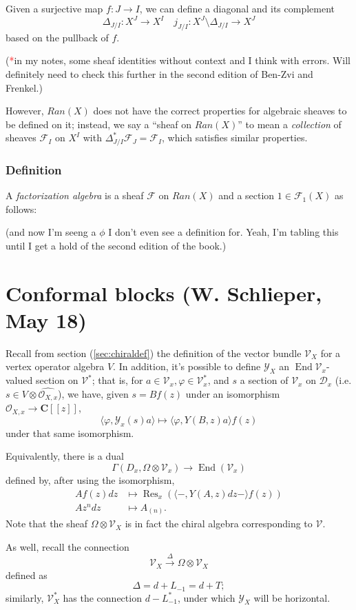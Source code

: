 \documentclass{article}
\newcommand{\CC}{\mathbold{C}}
\newcommand{\Oo}{\mathcal{O}}
\newcommand{\Dd}{\mathcal{D}}
\newcommand{\Ff}{\mathcal{F}}
\newcommand{\Vv}{\mathcal{V}}
\newcommand{\Yy}{\mathcal{Y}}
\newcommand{\tk}{\textcolor{red}{*}}
\DeclareMathOperator{\Res}{Res}
\DeclareMathOperator{\End}{End}
\begin{document}
Given a surjective map $f: J \rightarrow I$, we can define a diagonal and its complement
\[\Delta_{J/I}: X^J \rightarrow X^I \quad j_{J/I}: X^J \setminus \Delta_{J/I} \rightarrow X^J \]
based on the pullback of $f$.

(\tk in my notes, some sheaf identities without context and I think with errors.  Will definitely need to check this further in the second edition of Ben-Zvi and Frenkel.)

However, $Ran(X)$ does not have the correct properties for algebraic sheaves to be defined on it; instead, we say a ``sheaf on $Ran(X)$'' to mean a \textit{collection} of sheaves $\Ff_I$ on $X^I$ with $\Delta_{J/I}^*\Ff_J=\Ff_I$, which satisfies similar properties.

\subsubsection{Definition}
A \textit{factorization algebra} is a sheaf $\Ff$ on $Ran(X)$ and a section $1 \in \Ff_1(X)$ as follows:

(and now I'm seeng a $\phi$ I don't even see a definition for.  Yeah, I'm tabling this until I get a hold of the second edition of the book.)
\section{Conformal blocks (W. Schlieper, May 18)}
Recall from section (\ref{sec:chiraldef}) the definition of the vector bundle $\Vv_X$ for a vertex operator algebra $V$.  In addition, it's possible to define $\Yy_X$ an $\End{\Vv_x}$-valued section on $\Vv^*$; that is, for $a \in \Vv_x, \varphi \in \Vv^*_x$, and $s$ a section of $\Vv_x$ on $\Dd_x$ (i.e. $s \in V \otimes \widehat{\Oo_{X,x}}$), we have, given $s=Bf(z)$ under an isomorphism $\Oo_{X,x}\rightarrow \CC[[z]]$,
\[\langle \varphi,\Yy_x(s)a \rangle \mapsto \langle \varphi,Y(B,z)a \rangle f(z) \]
under that same isomorphism.

Equivalently, there is a dual 
\[\Gamma(D_x,\Omega \otimes \Vv_x) \rightarrow \End(\Vv_x) \]
defined by, after using the isomorphism,
\begin{align}
  A f(z) dz &\mapsto \Res_x(\langle -,Y(A,z)dz - \rangle f(z))\\
  Az^n dz &\mapsto A_{(n)}.
\end{align}
Note that the sheaf $\Omega \otimes \Vv_X$ is in fact the chiral algebra corresponding to $\Vv$.

As well, recall the connection
\[\Vv_X \overset{\Delta}{\rightarrow} \Omega \otimes \Vv_X \]
defined as
\[\Delta = d+L_{-1}=d+T; \]
similarly, $\Vv^*_X$ has the connection $d-L^*_{-1}$, under which $\Yy_X$ will be horizontal.
\end{document}
